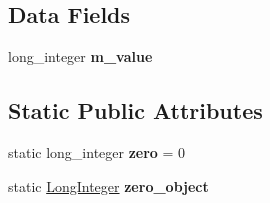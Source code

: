 \subsection*{Data Fields}
\begin{DoxyCompactItemize}
\item 
\mbox{\label{classez_1_1objects_1_1LongInteger_a204ed29aad25ee92509303f0768449f2}} 
long\+\_\+integer {\bfseries m\+\_\+value}
\end{DoxyCompactItemize}
\subsection*{Static Public Attributes}
\begin{DoxyCompactItemize}
\item 
\mbox{\label{classez_1_1objects_1_1LongInteger_a06db532fa2100af8e6c0a2d3062fa651}} 
static long\+\_\+integer {\bfseries zero} = 0
\item 
\mbox{\label{classez_1_1objects_1_1LongInteger_aea092e1420042411ad7af704e2467b03}} 
static \hyperlink{classez_1_1objects_1_1LongInteger}{Long\+Integer} {\bfseries zero\+\_\+object}
\end{DoxyCompactItemize}
